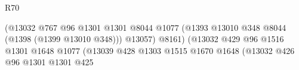\begin{lexlean}{R70}
\begin{coremodule}
                                                                      (@13032
                                                                        @767
                                                                        @96
                                                                        @1301
                                                                        @1301
                                                                        @8044
                                                                        @1077
                                                                        (@1393
                                                                          @13010
                                                                          @348
                                                                          @8044
                                                                          (@1398
                                                                            (@1399 @13010 @348)))
                                                                        @13057)
                                                                      @8161)
                                                                    (@13032
                                                                      @429
                                                                      @96
                                                                      @1516
                                                                      @1301
                                                                      @1648
                                                                      @1077
                                                                      (@13039
                                                                        @428
                                                                        @1303
                                                                        @1515
                                                                        @1670
                                                                        @1648
                                                                        (@13032
                                                                          @426
                                                                          @96
                                                                          @1301
                                                                          @1301
                                                                          @425

\end{coremodule}
\end{lexlean}
